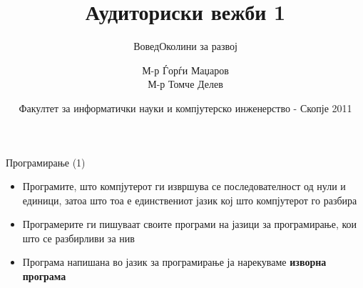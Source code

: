 \usepackage[T2A]{fontenc}
\usepackage[utf8]{inputenc}
\usepackage{listings}
\usepackage{verbatim}
\usepackage{tikz}
\usetikzlibrary{shapes,arrows}


\author[АВ1]{М-р Ѓорѓи Маџаров\\М-р Томче Делев}
\title[Структурирано програмирање]{Аудиториски вежби 1}
\subtitle{Вовед\linebreak Околини за развој}
\date{Факултет за информатички науки и компјутерско инженерство - Скопје 2011}





\frame[t,plain]{\titlepage}



\begin{frame}{Програмирање (1)}
\begin{itemize}
\item Програмите, што компјутерот ги извршува се последователност од нули и
единици, затоа што тоа е единствениот јазик кој што компјутерот го разбира
\item Програмерите ги пишуваат своите програми на јазици за програмирање, кои
што се разбирливи за нив 
\item Програма напишана во јазик за програмирање ја нарекуваме \textbf{изворна програма}
\end{itemize}
\end{frame}

